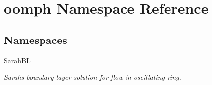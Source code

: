 \hypertarget{namespaceoomph}{}\section{oomph Namespace Reference}
\label{namespaceoomph}
\subsection*{Namespaces}
\begin{DoxyCompactItemize}
\item 
 \hyperlink{namespaceoomph_1_1SarahBL}{Sarah\+BL}
\begin{DoxyCompactList}\small\item\em Sarah\textquotesingle{}s boundary layer solution for flow in oscillating ring. \end{DoxyCompactList}\end{DoxyCompactItemize}
